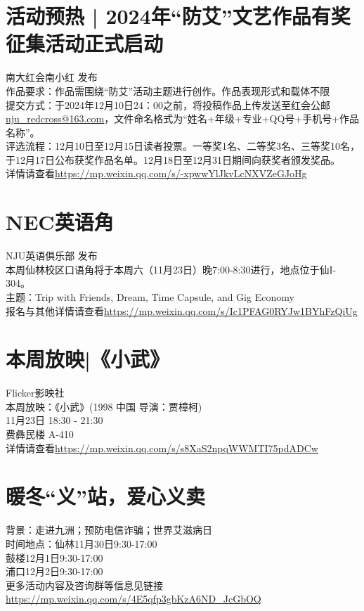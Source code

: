 \documentclass[letterpaper, 12pt]{article}
\begin{document}
\begin{multicols}{2}
\section{活动预热 | 2024年“防艾”文艺作品有奖征集活动正式启动}
南大红会南小红 发布\\
作品要求：作品需围绕“防艾”活动主题进行创作。作品表现形式和载体不限\\
提交方式：于2024年12月10日24：00之前，将投稿作品上传发送至红会公邮\url{nju_redcross@163.com}，文件命名格式为“姓名+年级+专业+QQ号+手机号+作品名称”。\\
评选流程：12月10日至12月15日读者投票。一等奖1名、二等奖3名、三等奖10名，于12月17日公布获奖作品名单。12月18日至12月31日期间向获奖者颁发奖品。\\
详情请查看\url{https://mp.weixin.qq.com/s/-xpwwYlJkvLcNXVZeGJoHg}\\

\section{NEC英语角}
NJU英语俱乐部 发布\\
本周仙林校区口语角将于本周六（11月23日）晚7:00-8:30进行，地点位于仙I-304。\\
主题：Trip with Friends, Dream, Time Capsule, and Gig Economy\\
报名与其他详情请查看\url{https://mp.weixin.qq.com/s/Ic1PFAG0RYJw1BYhFzQiUg}
\section{本周放映|《小武》}
Flicker影映社\\
本周放映：《小武》(1998 中国 导演：贾樟柯)\\
11月23日 18:30 - 21:30 \\
费彝民楼 A-410\\
详情请查看\url{https://mp.weixin.qq.com/s/s8XaS2npqWWMTI75pdADCw}\\
\section{暖冬“义”站，爱心义卖}
背景：走进九洲；预防电信诈骗；世界艾滋病日\\
时间地点：仙林11月30日9:30-17:00\\
鼓楼12月1日9:30-17:00\\
浦口12月2日9:30-17:00\\
更多活动内容及咨询群等信息见链接\url{https://mp.weixin.qq.com/s/4E5qfp3gbKzA6ND_JcGbOQ}


\end{multicols} 
\end{document}
